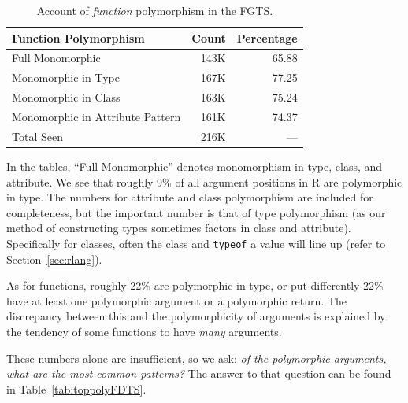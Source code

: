 \documentclass[acmsmall,10pt,review,anonymous]{acmart}\settopmatter{printfolios=true,printccs=false,printacmref=false}
\newcommand{\code}[1]{\lstinline|#1|\xspace}
\begin{document}
\begin{table}[ht]
\label{tab:funcountsFGTS}
\centering
\begin{tabular}{lrr}
  \hline
 Function Polymorphism & Count & Percentage \\ 
  \hline
  Full Monomorphic & 143K & 65.88 \\ 
  Monomorphic in Type & 167K & 77.25 \\ 
  Monomorphic in Class & 163K & 75.24 \\ 
  Monomorphic in Attribute Pattern & 161K & 74.37 \\ 
  Total Seen & 216K & --- \\ 
   \hline
\end{tabular}
\caption{Account of {\it function} polymorphism in the FGTS.}
\end{table}


In the tables, ``Full Monomorphic'' denotes monomorphism in type, class, and attribute.
We see that roughly 9\% of all argument positions in R are polymorphic in type.
The numbers for attribute and class polymorphism are included for
completeness, but the important number is that of type polymorphism (as our
method of constructing types sometimes factors in class and attribute).
Specifically for classes, often the class and \code{typeof} a value will
line up (refer to Section~\ref{sec:rlang}).

As for functions, roughly 22\% are polymorphic in type, or put differently 22\% have at least one polymorphic argument or a polymorphic return.
The discrepancy between this and the polymorphicity of arguments is explained by the tendency of some functions to have {\it many} arguments.

These numbers alone are insufficient, so we ask: {\it of the polymorphic arguments, what are the most common patterns?}
The answer to that question can be found in Table~\ref{tab:toppolyFDTS}.
\end{document}
